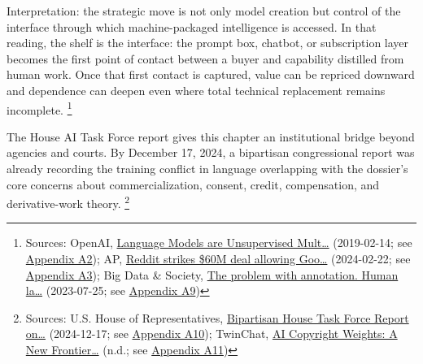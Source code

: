 \documentclass[
  american,
  11pt,
  letterpaper,
]{article}
\begin{document}
Interpretation: the strategic move is not only model creation but
control of the interface through which machine-packaged intelligence is
accessed. In that reading, the shelf is the interface: the prompt box,
chatbot, or subscription layer becomes the first point of contact
between a buyer and capability distilled from human work. Once that
first contact is captured, value can be repriced downward and dependence
can deepen even where total technical replacement remains incomplete.
\footnote{Sources: OpenAI,
  \href{https://cdn.openai.com/better-language-models/language_models_are_unsupervised_multitask_learners.pdf}{Language
  Models are Unsupervised Mult\ldots{}} (2019-02-14; see
  \hyperref[ch-04-appendix-a2-language-models-are-unsupervised-multitask-learners]{Appendix
  A2}); AP,
  \href{https://apnews.com/article/a7f131c7cb4225307134ef21d3c6a708}{Reddit
  strikes \$60M deal allowing Goo\ldots{}} (2024-02-22; see
  \hyperref[ch-04-appendix-a3-reddit-strikes-60m-deal-allowing-google-to-train-ai-models-on-its-posts-unveils-ipo-plans]{Appendix
  A3}); Big Data \& Society,
  \href{https://journals.sagepub.com/doi/10.1177/20539517231188723}{The
  problem with annotation. Human la\ldots{}} (2023-07-25; see
  \hyperref[ch-04-appendix-a9-the-problem-with-annotation-human-labour-and-outsourcing-between-france-and-madagascar]{Appendix
  A9})}

The House AI Task Force report gives this chapter an institutional
bridge beyond agencies and courts. By December 17, 2024, a bipartisan
congressional report was already recording the training conflict in
language overlapping with the dossier's core concerns about
commercialization, consent, credit, compensation, and derivative-work
theory. \footnote{Sources: U.S. House of Representatives,
  \href{https://www.speaker.gov/wp-content/uploads/2024/12/AI-Task-Force-Report-FINAL.pdf}{Bipartisan
  House Task Force Report on\ldots{}} (2024-12-17; see
  \hyperref[ch-04-appendix-a10-bipartisan-house-task-force-report-on-artificial-intelligence]{Appendix
  A10}); TwinChat,
  \href{https://medium.com/twinchat/ai-copyright-weights-a-new-frontier-in-intellectual-property-law-d8ee1b6c55ee}{AI
  Copyright Weights: A New Frontier\ldots{}} (n.d.; see
  \hyperref[ch-04-appendix-a11-ai-copyright-weights-a-new-frontier-in-intellectual-property-law]{Appendix
  A11})}
\end{document}

